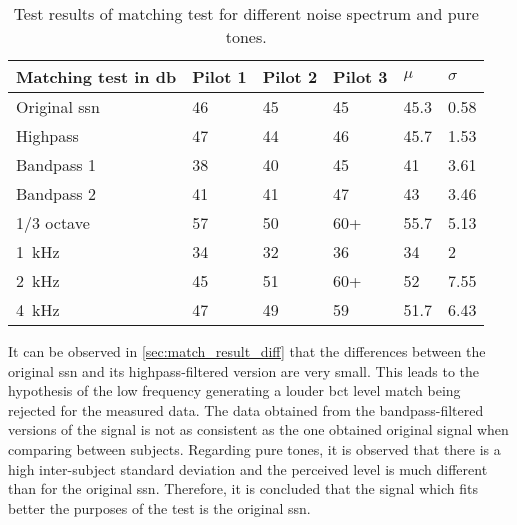 \begin{table}[H]
\centering
\caption{Test results of matching test for different noise spectrum and pure tones.} %
\begin{tabular}{l|lll|ll}
Matching test in \si{\decibel}       & Pilot 1 & Pilot 2 & Pilot 3 & $\mu$ & $\sigma$ \\ \hline
Original \gls{ssn}         & 46        & 45        & 45        & 45.3        & 0.58               \\
Highpass         & 47        & 44        & 46        & 45.7        & 1.53               \\
Bandpass 1         & 38        & 40        & 45        & 41          & 3.61               \\
Bandpass 2        & 41        & 41        & 47        & 43          & 3.46               \\
1/3 octave & 57        & 50        & 60+       & 55.7        & 5.13               \\
\SI{1}{\kilo\hertz}                   & 34        & 32        & 36        & 34          & 2                  \\
\SI{2}{\kilo\hertz}                  & 45        & 51        & 60+       & 52          & 7.55               \\
\SI{4}{\kilo\hertz}                  & 47        & 49        & 59        & 51.7        &  6.43                 
\end{tabular}
\label{sec:match_result_diff}
\end{table}


It can be observed in \autoref{sec:match_result_diff} that the differences between the original \gls{ssn} and its highpass-filtered version are very small. This leads to the hypothesis of the low frequency generating a louder \gls{bct} level match being rejected for the measured data. The data obtained from the bandpass-filtered versions of the signal is not as consistent as the one obtained original signal when comparing between subjects. Regarding pure tones, it is observed that there is a high inter-subject standard deviation and the perceived level is much different than for the original \gls{ssn}. Therefore, it is concluded that the signal which fits better the purposes of the test is the original \gls{ssn}.



